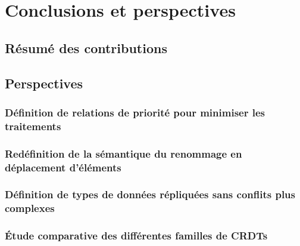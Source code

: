 \documentclass[12pt]{thesul}
\theoremstyle{definition}
\newcommand{\lepoch}{$<_{\varepsilon}$~}
\begin{document}

\NumberThisInToc
\chapter{Conclusions et perspectives}
\minitoc
\section{Résumé des contributions}
\section{Perspectives}


\subsection{Définition de relations de priorité pour minimiser les traitements}
\subsection{Redéfinition de la sémantique du renommage en déplacement d'éléments}
\subsection{Définition de types de données répliquées sans conflits plus complexes}

\subsection{Étude comparative des différentes familles de CRDTs}
\end{document}
